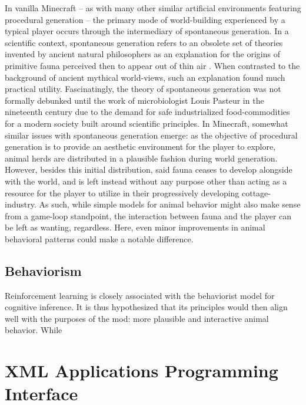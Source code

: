 \documentclass[]{article}
\begin{document}
In vanilla Minecraft -- as with many other similar artificial environments featuring procedural generation -- the primary mode of world-building experienced by a typical player occurs through the intermediary of spontaneous generation. In a scientific context, spontaneous generation refers to an obsolete set of theories invented by ancient natural philosophers as an explanation for the origins of primitive fauna perceived then to appear out of thin air \cite{SpontaneousGeneration}. When contrasted to the background of ancient mythical world-views, such an explanation found much practical utility. Fascinatingly, the theory of spontaneous generation was not formally debunked until the work of microbiologist Louis Pasteur in the nineteenth century due to the demand for safe industrialized food-commodities for a modern society built around scientific principles. In Minecraft, somewhat similar issues with spontaneous generation emerge: as the objective of procedural generation is to provide an aesthetic environment for the player to explore, animal herds are distributed in a plausible fashion during world generation. However, besides this initial distribution, said fauna ceases to develop alongside with the world, and is left instead without any purpose other than acting as a resource for the player to utilize in their progressively developing cottage-industry. As such, while simple models for animal behavior might also make sense from a game-loop standpoint, the interaction between fauna and the player can be left as wanting, regardless. Here, even minor improvements in animal behavioral patterns could make a notable difference.

\subsection{Behaviorism}

Reinforcement learning is closely associated with the behaviorist model for cognitive inference. It is thus hypothesized that its principles would then align well with the purposes of the mod: more plausible and interactive animal behavior. While

\newpage
\section{XML Applications Programming Interface}

\end{document}
